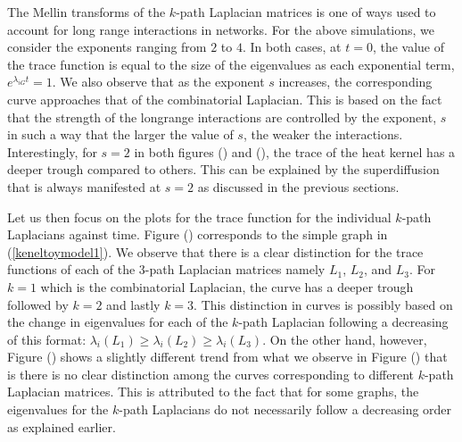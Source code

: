 \documentclass[10pt,a4paper]{article}
\begin{document}
	  The Mellin transforms of the $k$-path Laplacian matrices is one of ways used to account for long range interactions in networks. For the above simulations, we consider the exponents ranging from $2$ to $4$. In both cases, at $t=0$, the value of the trace function is equal to the size of the eigenvalues as each exponential term, $e^{\lambda_{iG}t} = 1$.  We also observe that as the exponent $s$ increases, the corresponding curve approaches that of the combinatorial Laplacian. This is based on the fact that the strength of the longrange interactions are controlled by the exponent, $s$ in such a way that the larger the value of $s$, the weaker the interactions. Interestingly, for $s=2$ in both figures () and (), the trace of the heat kernel has a deeper trough compared to others. This can be explained by the superdiffusion that is always manifested at $s=2$ as discussed in the previous sections.
	  
	  Let us then focus on the plots for the trace function for the individual $k$-path Laplacians against time. Figure () corresponds to the simple graph in (\ref{keneltoymodel1}). We observe that there is a clear distinction for the trace functions of each of the $3$-path Laplacian matrices namely $L_1$, $L_2$, and $L_3$. For $k=1$ which is the combinatorial Laplacian, the curve has a deeper trough followed by $k=2$ and lastly $k=3$. This distinction in curves is possibly based on the change in eigenvalues for each of the $k$-path Laplacian following a decreasing of this format: $\lambda_i(L_1) \geq \lambda_i(L_2) \geq \lambda_i(L_3)$. On the other hand, however, Figure () shows a slightly different trend from what we observe in Figure () that is there is no clear distinction among the curves corresponding to different $k$-path Laplacian matrices. This is attributed to the fact that for some graphs, the eigenvalues for the $k$-path Laplacians do not necessarily follow a decreasing order as explained earlier.
	  
\end{document}
